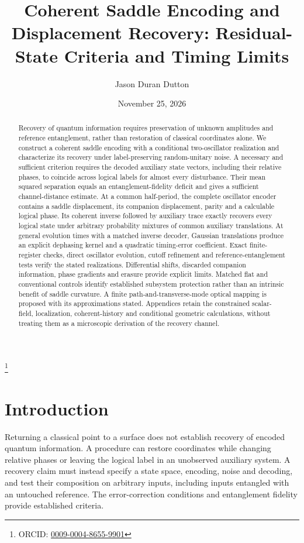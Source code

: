 \documentclass[aip,adv,reprint,onecolumn,amsmath,amssymb]{revtex4-2}
\begin{document}
\title{Coherent Saddle Encoding and Displacement Recovery: Residual-State Criteria and Timing Limits}
\author{Jason Duran Dutton}
\thanks{ORCID: \href{https://orcid.org/0009-0004-8655-9901}{0009-0004-8655-9901}}
\date{November 25, 2026}
\begin{abstract}
Recovery of quantum information requires preservation of unknown amplitudes and reference entanglement, rather than restoration of classical coordinates alone. We construct a coherent saddle encoding with a conditional two-oscillator realization and characterize its recovery under label-preserving random-unitary noise. A necessary and sufficient criterion requires the decoded auxiliary state vectors, including their relative phases, to coincide across logical labels for almost every disturbance. Their mean squared separation equals an entanglement-fidelity deficit and gives a sufficient channel-distance estimate. At a common half-period, the complete oscillator encoder contains a saddle displacement, its companion displacement, parity and a calculable logical phase. Its coherent inverse followed by auxiliary trace exactly recovers every logical state under arbitrary probability mixtures of common auxiliary translations. At general evolution times with a matched inverse decoder, Gaussian translations produce an explicit dephasing kernel and a quadratic timing-error coefficient. Exact finite-register checks, direct oscillator evolution, cutoff refinement and reference-entanglement tests verify the stated realizations. Differential shifts, discarded companion information, phase gradients and erasure provide explicit limits. Matched flat and conventional controls identify established subsystem protection rather than an intrinsic benefit of saddle curvature. A finite path-and-transverse-mode optical mapping is proposed with its approximations stated. Appendices retain the constrained scalar-field, localization, coherent-history and conditional geometric calculations, without treating them as a microscopic derivation of the recovery channel.
\end{abstract}
\maketitle

\section{Introduction}
Returning a classical point to a surface does not establish recovery of encoded quantum information. A procedure can restore coordinates while changing relative phases or leaving the logical label in an unobserved auxiliary system. A recovery claim must instead specify a state space, encoding, noise and decoding, and test their composition on arbitrary inputs, including inputs entangled with an untouched reference. The error-correction conditions and entanglement fidelity provide established criteria.\cite{knill,nielsen}
\end{document}
